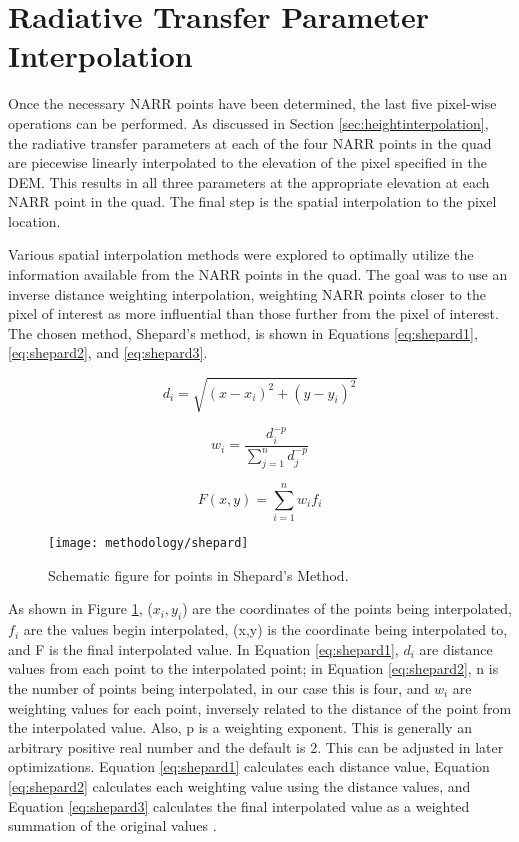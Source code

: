 \documentclass{book}
\begin{document}
\section{Radiative Transfer Parameter Interpolation}
\label{sec:spatialinterpolation}

Once the necessary NARR points have been determined, the last five pixel-wise operations can be performed.  As discussed in Section \ref{sec:heightinterpolation}, the radiative transfer parameters at each of the four NARR points in the quad are piecewise linearly interpolated to the elevation of the pixel specified in the DEM.  This results in all three parameters at the appropriate elevation at each NARR point in the quad.  The final step is the spatial interpolation to the pixel location.

Various spatial interpolation methods were explored to optimally utilize the information available from the NARR points in the quad.  The goal was to use an inverse distance weighting interpolation,  weighting NARR points closer to the pixel of interest as more influential than those further from the pixel of interest.  The chosen method, Shepard's method, is shown in Equations \ref{eq:shepard1}, \ref{eq:shepard2}, and \ref{eq:shepard3}.  

\begin{equation}
d_i = \sqrt{(x-x_i)^2+(y-y_i)^2}
\label{eq:shepard1}
\end{equation}

\begin{equation}
w_i = \frac{d_i^{-p}}{\sum_{j=1}^nd_j^{-p}}
\label{eq:shepard2}
\end{equation}

\begin{equation}
F(x,y) = \sum_{i=1}^nw_if_i
\label{eq:shepard3}
\end{equation}

\begin{figure}[H]
\centering
\texttt{[image: methodology/shepard]}
\caption{Schematic figure for points in Shepard's Method.}
\label{fig:shepard}
\end{figure}

As shown in Figure \ref{fig:shepard}, ($x_i,y_i$) are the coordinates of the points being interpolated, $f_i$ are the values begin interpolated, (x,y) is the coordinate being interpolated to, and F is the final interpolated value.  In Equation \ref{eq:shepard1}, $d_i$ are distance values from each point to the interpolated point; in Equation \ref{eq:shepard2}, n is the number of points being interpolated, in our case this is four, and $w_i$ are weighting values for each point, inversely related to the distance of the point from the interpolated value.  Also, p is a weighting exponent.  This is generally an arbitrary positive real number and the default is 2.  This can be adjusted in later optimizations.  Equation \ref{eq:shepard1} calculates each distance value, Equation \ref{eq:shepard2} calculates each weighting value using the distance values, and Equation \ref{eq:shepard3} calculates the final interpolated value as a weighted summation of the original values \cite{shepard_1968}.
\end{document}
